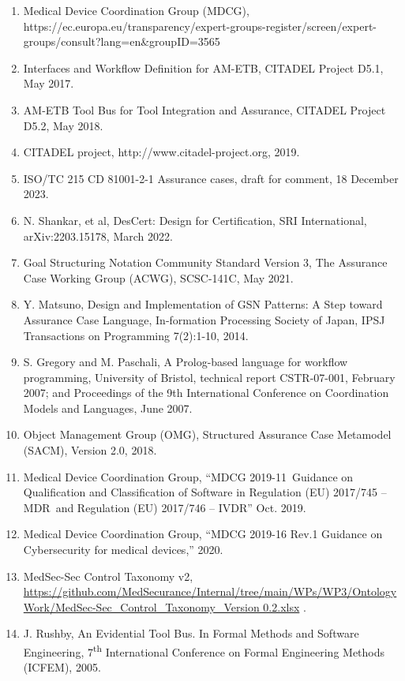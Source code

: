 \documentclass[12pt,twoside,a4paper]{article}
\begin{document}
\begin{enumerate}
\def\labelenumi{\arabic{enumi}.}
\item
  Medical Device Coordination Group (MDCG), https://ec.europa.eu/transparency/expert-groups-register/screen/expert-groups/consult?lang=en\&groupID=3565
\item
  Interfaces and Workflow Definition for AM-ETB, CITADEL Project D5.1, May 2017.
\item
  AM-ETB Tool Bus for Tool Integration and Assurance, CITADEL Project D5.2, May 2018.
\item
  CITADEL project, http://www.citadel-project.org, 2019.
\item
  ISO/TC 215 CD 81001-2-1 Assurance cases, draft for comment, 18 December 2023.
\item
  N. Shankar, et al, DesCert: Design for Certification, SRI International, arXiv:2203.15178, March 2022.
\item
  Goal Structuring Notation Community Standard Version 3, The Assurance Case Working Group (ACWG), SCSC-141C, May 2021.
\item
  Y. Matsuno, Design and Implementation of GSN Patterns: A Step toward Assurance Case Language, In-formation Processing Society of Japan, IPSJ Transactions on Programming 7(2):1-10, 2014.
\item
  S. Gregory and M. Paschali, A Prolog-based language for workflow programming, University of Bristol, technical report CSTR-07-001, February 2007; and Proceedings of the 9th International Conference on Coordination Models and Languages, June 2007.
\item
  Object Management Group (OMG), Structured Assurance Case Metamodel (SACM), Version 2.0, 2018.
\item
  Medical Device Coordination Group, ``MDCG 2019-11~Guidance on Qualification and Classification of Software in Regulation (EU) 2017/745 -- MDR~and Regulation (EU) 2017/746 -- IVDR'' Oct. 2019.
\item
  Medical Device Coordination Group, ``MDCG 2019-16 Rev.1 Guidance on Cybersecurity for medical devices,'' 2020.
\item
  MedSec-Sec Control Taxonomy v2, \href{https://github.com/MedSecurance/Internal/tree/main/WPs/WP3/OntologyWork/MedSec-Sec_Control_Taxonomy_Version\%200.2.xlsx}{https://github.com/MedSecurance/Internal/tree/main/WPs/WP3/OntologyWork/MedSec-Sec\_Control\_Taxonomy\_Version 0.2.xlsx} .
\item
  J. Rushby, An Evidential Tool Bus. In Formal Methods and Software Engineering, 7\textsuperscript{th} International Conference on Formal Engineering Methods (ICFEM), 2005.

\end{enumerate}
\end{document}
